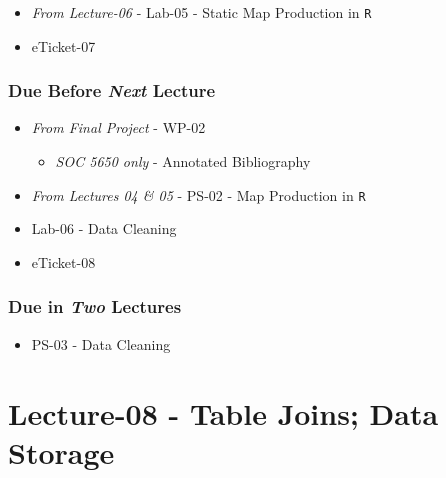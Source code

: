 \documentclass[]{book}
\providecommand{\tightlist}{%
  \setlength{\itemsep}{0pt}\setlength{\parskip}{0pt}}
\begin{document}
\begin{itemize}
\tightlist
\item
  \emph{From Lecture-06} - Lab-05 - Static Map Production in \texttt{R}
\item
  eTicket-07
\end{itemize}

\hypertarget{due-before-next-lecture-5}{%
\subsubsection*{\texorpdfstring{Due Before \emph{Next} Lecture}{Due Before Next Lecture}}\label{due-before-next-lecture-5}}

\begin{itemize}
\tightlist
\item
  \emph{From Final Project} - WP-02

  \begin{itemize}
  \tightlist
  \item
    \emph{SOC 5650 only} - Annotated Bibliography
  \end{itemize}
\item
  \emph{From Lectures 04 \& 05} - PS-02 - Map Production in \texttt{R}
\item
  Lab-06 - Data Cleaning
\item
  eTicket-08
\end{itemize}

\hypertarget{due-in-two-lectures-3}{%
\subsubsection*{\texorpdfstring{Due in \emph{Two} Lectures}{Due in Two Lectures}}\label{due-in-two-lectures-3}}

\begin{itemize}
\tightlist
\item
  PS-03 - Data Cleaning
\end{itemize}

\hypertarget{lecture-08---table-joins-data-storage}{%
\section*{Lecture-08 - Table Joins; Data Storage}\label{lecture-08---table-joins-data-storage}}
\end{document}
